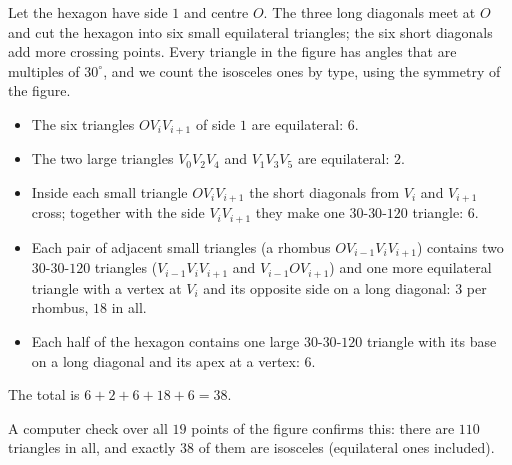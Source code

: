 Let the hexagon have side $1$ and centre $O$. The three long diagonals meet at $O$ and cut the hexagon into six small equilateral triangles; the six short diagonals add more crossing points. Every triangle in the figure has angles that are multiples of $30^\circ$, and we count the isosceles ones by type, using the symmetry of the figure.
\begin{itemize}
\item The six triangles $OV_iV_{i+1}$ of side $1$ are equilateral: $6$.
\item The two large triangles $V_0V_2V_4$ and $V_1V_3V_5$ are equilateral: $2$.
\item Inside each small triangle $OV_iV_{i+1}$ the short diagonals from $V_i$ and $V_{i+1}$ cross; together with the side $V_iV_{i+1}$ they make one $30$-$30$-$120$ triangle: $6$.
\item Each pair of adjacent small triangles (a rhombus $OV_{i-1}V_iV_{i+1}$) contains two $30$-$30$-$120$ triangles ($V_{i-1}V_iV_{i+1}$ and $V_{i-1}OV_{i+1}$) and one more equilateral triangle with a vertex at $V_i$ and its opposite side on a long diagonal: $3$ per rhombus, $18$ in all.
\item Each half of the hexagon contains one large $30$-$30$-$120$ triangle with its base on a long diagonal and its apex at a vertex: $6$.
\end{itemize}
The total is $6+2+6+18+6=\boxed{38}$.

A computer check over all $19$ points of the figure confirms this: there are $110$ triangles in all, and exactly $38$ of them are isosceles (equilateral ones included).
